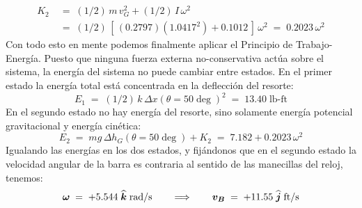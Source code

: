 \documentclass[ a4paper, twoside, 11pt]{article}
\begin{document}
\begin{problem}
\begin{align*}
K_2 \; & = \; 
(1/2) \, m \, v_G^2 + (1/2) \, I \, \omega^2 \\
& = \; (1/2) \, [ \, (0.2797)(1.0417^2) + 0.1012 \, ] \, \omega^2
\; = \; 0.2023 \, \omega^2
\end{align*}
Con todo esto en mente podemos finalmente aplicar el Principio de Trabajo-Energ\'ia. Puesto que ninguna fuerza externa no-conservativa act\'ua sobre el sistema, la energ\'ia del sistema no puede cambiar entre estados. En el primer estado la energ\'ia total est\'a concentrada en la deflecci\'on del resorte: 
\[
E_1 \; = \; (1/2) \, k \, \Delta x(\theta = 50\deg)^2 \; = \;
13.40 \; \text{lb-ft}
\]
En el segundo estado no hay energ\'ia del resorte, sino solamente energ\'ia potencial gravitacional y energ\'ia cin\'etica: 
\[
E_2 \; = \; mg \, \Delta h_G(\theta = 50\deg) + K_2 \; = \;
7.182 + 0.2023 \, \omega^2
\]
Igualando las energ\'ias en los dos estados, y fij\'andonos que en el segundo estado la velocidad angular de la barra es contraria al sentido de las manecillas del reloj, tenemos: 
\[
{\boldsymbol{\omega}} \; = \; +5.544 \; {\boldsymbol{\widehat{k}}} \; \text{rad/s}
\qquad \Longrightarrow \qquad
{\boldsymbol{v_B}} \; = \; +11.55 \; {\boldsymbol{\widehat{j}}} \; \text{ft/s}
\]
\QED

\end{problem}
\fullskip
\end{document}
